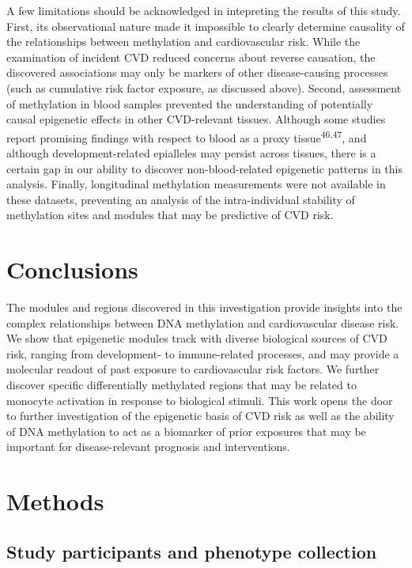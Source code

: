 \documentclass[]{article}
\theoremstyle{definition}
\theoremstyle{definition}
\theoremstyle{definition}
\theoremstyle{remark}
\begin{document}
A few limitations should be acknowledged in intepreting the results of
this study. First, its observational nature made it impossible to
clearly determine causality of the relationships between methylation and
cardiovascular risk. While the examination of incident CVD reduced
concerns about reverse causation, the discovered associations may only
be markers of other disease-causing processes (such as cumulative risk
factor exposure, as discussed above). Second, assessment of methylation
in blood samples prevented the understanding of potentially causal
epigenetic effects in other CVD-relevant tissues. Although some studies
report promising findings with respect to blood as a proxy
tissue\textsuperscript{46,47}, and although development-related
epialleles may persist across tissues, there is a certain gap in our
ability to discover non-blood-related epigenetic patterns in this
analysis. Finally, longitudinal methylation measurements were not
available in these datasets, preventing an analysis of the
intra-individual stability of methylation sites and modules that may be
predictive of CVD risk.

\section{Conclusions}\label{conclusions}

The modules and regions discovered in this investigation provide
insights into the complex relationships between DNA methylation and
cardiovascular disease risk. We show that epigenetic modules track with
diverse biological sources of CVD risk, ranging from development- to
immune-related processes, and may provide a molecular readout of past
exposure to cardiovascular risk factors. We further discover specific
differentially methylated regions that may be related to monocyte
activation in response to biological stimuli. This work opens the door
to further investigation of the epigenetic basis of CVD risk as well as
the ability of DNA methylation to act as a biomarker of prior exposures
that may be important for disease-relevant prognosis and interventions.

\section{Methods}\label{methods}

\subsection{Study participants and phenotype
collection}\label{study-participants-and-phenotype-collection}
\end{document}
